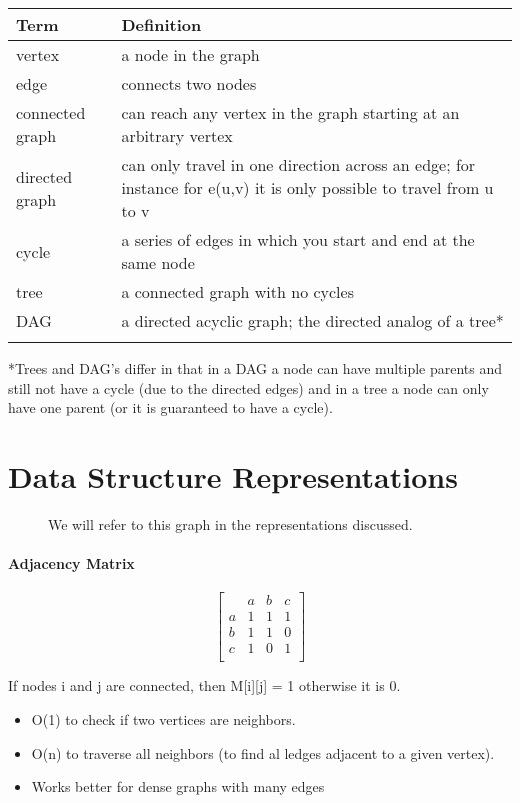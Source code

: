 \begin{tabular}{lp{12cm}}
    \toprule
    Term & Definition \\
    \midrule
    vertex    & a node in the graph \\
    \addlinespace
    edge    & connects two nodes \\
    \addlinespace
    connected graph    & can reach any vertex in the graph starting at an arbitrary vertex \\
    \addlinespace
    directed graph    & can only travel in one direction across an edge; for instance for e(u,v) it is only possible to travel from u to v \\
    \addlinespace
    cycle & a series of edges in which you start and end at the same node \\
    \addlinespace
    tree & a connected graph with no cycles \\
    \addlinespace
    DAG & a directed acyclic graph; the directed analog of a tree*  \\
    \addlinespace
    \bottomrule
  \end{tabular}

  *Trees and DAG's differ in that in a DAG a node can have multiple parents and still not have a cycle (due to the directed edges) and in a tree a node can only have one parent (or it is guaranteed to have a cycle).

\section{Data Structure Representations}
\begin{figure}
    \centering
    \caption{We will refer to this graph in the representations discussed.}
\end{figure}

\paragraph{Adjacency Matrix}
\[
\begin{bmatrix}
     & a & b & c \\
   a & 1 & 1 & 1 \\
   b & 1 & 1 & 0 \\
   c & 1 & 0 & 1 \\
\end{bmatrix}
\]

If nodes i and j are connected, then M[i][j] = 1 otherwise it is 0.

\begin{itemize}
    \item O(1) to check if two vertices are neighbors.
    \item O(n) to traverse all neighbors (to find al ledges adjacent to a given vertex).
    \item Works better for dense graphs with many edges
\end{itemize}


